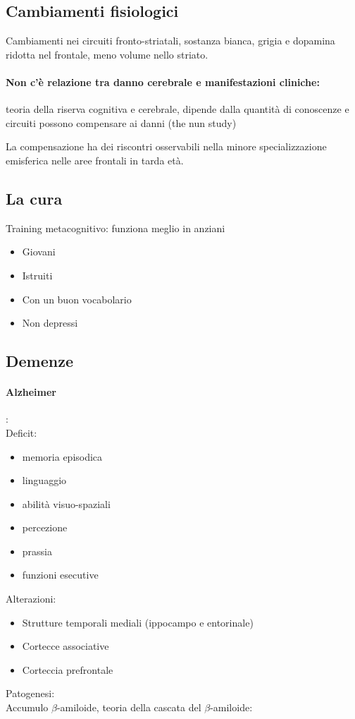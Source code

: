 \documentclass[12pt, a4paper]{article}
\begin{document}
\subsection{Cambiamenti fisiologici} 

Cambiamenti nei circuiti fronto-striatali, sostanza bianca, grigia e dopamina ridotta nel frontale, meno volume nello striato.

\paragraph{Non c'è relazione tra danno cerebrale e manifestazioni cliniche:}  teoria della riserva cognitiva e cerebrale, dipende dalla quantità di conoscenze e circuiti possono compensare ai danni (the nun study)

La compensazione ha dei riscontri osservabili nella minore specializzazione emisferica nelle aree frontali in tarda età.

\subsection{La cura} 

Training metacognitivo: funziona meglio in anziani
\begin{itemize}
    \item Giovani
    \item Istruiti
    \item Con un buon vocabolario
    \item Non depressi
\end{itemize}

\subsection{Demenze} 
    
\paragraph{Alzheimer}:\\
Deficit: 
\begin{itemize}
    \item memoria episodica 
    \item linguaggio
    \item abilità visuo-spaziali
    \item percezione
    \item prassia
    \item funzioni esecutive
\end{itemize}
Alterazioni:
\begin{itemize}
    \item Strutture temporali mediali (ippocampo e entorinale)
    \item Cortecce associative  
    \item Corteccia prefrontale
\end{itemize}
Patogenesi:\\
Accumulo $\beta$-amiloide, teoria della cascata del $\beta$-amiloide:
\end{document}
